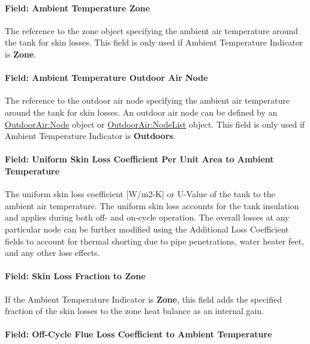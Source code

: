 \paragraph{Field: Ambient Temperature Zone}\label{field-ambient-temperature-zone}

The reference to the zone object specifying the ambient air temperature around the tank for skin losses. This field is only used if Ambient Temperature Indicator is \textbf{Zone}.

\paragraph{Field: Ambient Temperature Outdoor Air Node}\label{field-ambient-temperature-outdoor-air-node}

The reference to the outdoor air node specifying the ambient air temperature around the tank for skin losses. An outdoor air node can be defined by an \hyperref[outdoorairnode]{OutdoorAir:Node} object or \hyperref[outdoorairnodelist]{OutdoorAir:NodeList} object. This field is only used if Ambient Temperature Indicator is \textbf{Outdoors}.

\paragraph{Field: Uniform Skin Loss Coefficient Per Unit Area to Ambient Temperature}\label{field-uniform-skin-loss-coefficient-per-unit-area-to-ambient-temperature-000}

The uniform skin loss coefficient {[}W/m2-K{]} or U-Value of the tank to the ambient air temperature. The uniform skin loss accounts for the tank insulation and applies during both off- and on-cycle operation. The overall losses at any particular node can be further modified using the Additional Loss Coefficient fields to account for thermal shorting due to pipe penetrations, water heater feet, and any other loss effects.

\paragraph{Field: Skin Loss Fraction to Zone}\label{field-skin-loss-fraction-to-zone}

If the Ambient Temperature Indicator is \textbf{Zone}, this field adds the specified fraction of the skin losses to the zone heat balance as an internal gain.

\paragraph{Field: Off-Cycle Flue Loss Coefficient to Ambient Temperature}\label{field-off-cycle-flue-loss-coefficient-to-ambient-temperature}

